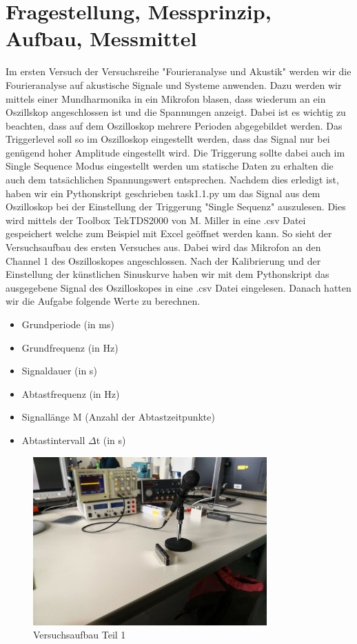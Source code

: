 \documentclass[12pt, oneside, a4paper, \docLanguage]{report}
\begin{document}
\section{Fragestellung, Messprinzip, Aufbau, Messmittel}
\label{chap:VERSUCH_1_FRAGESTELLUNG}
Im ersten Versuch der Versuchsreihe "Fourieranalyse und Akustik" werden wir die Fourieranalyse auf akustische Signale und Systeme anwenden.
Dazu werden wir mittels einer Mundharmonika in ein Mikrofon blasen, dass wiederum an ein Oszillskop angeschlossen ist und die Spannungen anzeigt.
Dabei ist es wichtig zu beachten, dass auf dem Oszilloskop mehrere Perioden abgegebildet werden. Das Triggerlevel soll so im Oszilloskop eingestellt werden, dass das Signal nur bei genügend hoher Amplitude eingestellt wird.
Die Triggerung sollte dabei auch im Single Sequence Modus eingestellt werden um statische Daten zu erhalten die auch dem tatsächlichen Spannungswert entsprechen.
Nachdem dies erledigt ist, haben wir ein Pythonskript geschrieben task1.1.py um das Signal aus dem Oszilloskop bei der Einstellung der Triggerung "Single Sequenz" auszulesen.
Dies wird mittels der Toolbox TekTDS2000 von M. Miller in eine .csv Datei gespeichert welche zum Beispiel mit Excel geöffnet werden kann.
\newpage
So sieht der Versuchsaufbau des ersten Versuches aus. Dabei wird das Mikrofon an den Channel 1 des Oszilloskopes angeschlossen. Nach der Kalibrierung und der Einstellung der künstlichen Sinuskurve haben wir mit dem Pythonskript das ausgegebene Signal des Oszilloskopes in eine .csv Datei eingelesen.
Danach hatten wir die Aufgabe folgende Werte zu berechnen.~\par
\begin{itemize}
	\item Grundperiode (in ms)
	\item Grundfrequenz (in Hz)
	\item Signaldauer (in s)
	\item Abtastfrequenz (in Hz)
	\item Signallänge M (Anzahl der Abtastzeitpunkte)
	\item Abtastintervall $\Delta$t (in s)
\end{itemize}
\begin{figure}[H]
	\centering\small
	\includegraphics[width=0.8\textwidth]{media/aufbau2.jpg}
	\caption{Versuchsaufbau Teil 1}
	\label{img:Versuchsaufbau Teil 1}
\end{figure}
\end{document}
